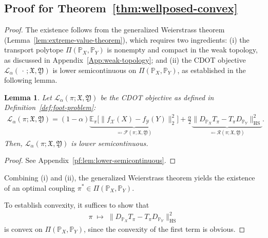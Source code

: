 \documentclass{article}
\theoremstyle{plain}
\newtheorem{lemma}[theorem]{Lemma}
\theoremstyle{definition}
\theoremstyle{remark}
\begin{document}
\subsection{Proof for Theorem~\ref{thm:wellposed-convex}}\label{pf:thm:wellposed-convex}
\begin{proof}
	The existence follows from the generalized Weierstrass theorem (Lemma~\ref{lem:extreme-value-theorem}), which requires two ingredients: (i) the transport polytope $\Pi(\mathbb{P}_X,\mathbb{P}_Y)$ is nonempty and compact in the weak topology, as discussed in Appendix~\ref{App:weak-topology}; and (ii) the CDOT objective $\mathcal{L}_{\alpha}(\,\cdot\,; \mathfrak{X},\mathfrak{Y})$ is lower semicontinuous on $\Pi(\mathbb{P}_X,\mathbb{P}_Y)$, as established in the following lemma.
	\begin{lemma}
		\label{lem:lower-semicontinuous}
		Let $\mathcal{L}_{\alpha}(\pi; \mathfrak{X},\mathfrak{Y})$ be the CDOT objective as defined in Definition~\ref{def:foot-problem}:
		\begin{align*}
			\mathcal{L}_{\alpha}(\pi; \mathfrak{X},\mathfrak{Y}) = (1-\alpha)\underbrace{\mathbb{E}_{\pi}\big[\|f_{\mathcal{X}}(X)-f_{\mathcal{Y}}(Y)\|_2^2\big]}_{\eqqcolon \mathcal{F}(\pi; \mathfrak{X},\mathfrak{Y})} + \frac{\alpha}{2} \underbrace{\| D_{\mathbb{P}_X}T_\pi - T_\pi D_{\mathbb{P}_Y} \|_{\mathrm{HS}}^2}_{\eqqcolon \mathcal{R}(\pi; \mathfrak{X},\mathfrak{Y})} .
		\end{align*}
		Then, $\mathcal{L}_{\alpha}(\pi; \mathfrak{X},\mathfrak{Y})$ is lower semicontinuous.
	\end{lemma}
	\begin{proof}
		See Appendix~\ref{pf:lem:lower-semicontinuous}.
	\end{proof}
	Combining (i) and (ii), the generalized Weierstrass theorem yields the existence of an optimal coupling $\pi^* \in \Pi(\mathbb{P}_X,\mathbb{P}_Y)$.
	
	To establish convexity, it suffices to show that 
	\begin{align*}
		\pi \;\mapsto\; \|D_{\mathbb{P}_X}T_\pi - T_\pi D_{\mathbb{P}_Y}\|_{\mathrm{HS}}^2
	\end{align*}
	is convex on $\Pi(\mathbb{P}_X,\mathbb{P}_Y)$, since the convexity of the first term is obvious.
	

\end{proof}
\end{document}
